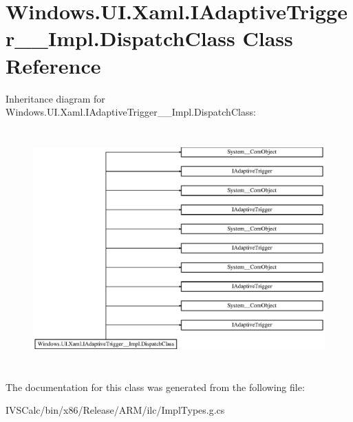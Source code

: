 \hypertarget{class_windows_1_1_u_i_1_1_xaml_1_1_i_adaptive_trigger_____impl_1_1_dispatch_class}{}\section{Windows.\+U\+I.\+Xaml.\+I\+Adaptive\+Trigger\+\_\+\+\_\+\+Impl.\+Dispatch\+Class Class Reference}
\label{class_windows_1_1_u_i_1_1_xaml_1_1_i_adaptive_trigger_____impl_1_1_dispatch_class}
Inheritance diagram for Windows.\+U\+I.\+Xaml.\+I\+Adaptive\+Trigger\+\_\+\+\_\+\+Impl.\+Dispatch\+Class\+:\begin{figure}[H]
\begin{center}
\leavevmode
\includegraphics[height=9.194030cm]{class_windows_1_1_u_i_1_1_xaml_1_1_i_adaptive_trigger_____impl_1_1_dispatch_class}
\end{center}
\end{figure}


The documentation for this class was generated from the following file\+:\begin{DoxyCompactItemize}
\item 
I\+V\+S\+Calc/bin/x86/\+Release/\+A\+R\+M/ilc/Impl\+Types.\+g.\+cs\end{DoxyCompactItemize}

